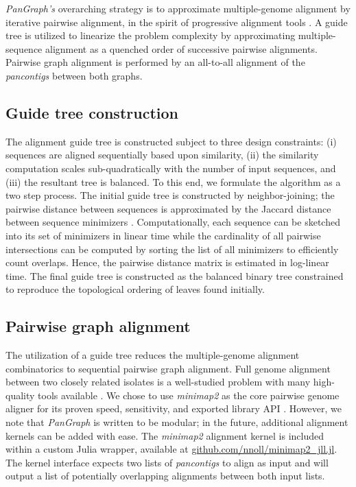\documentclass[aps,rmp,reprint,superscriptaddress,notitlepage,10pt]{revtex4-1}
\begin{document}
\emph{PanGraph's} overarching strategy is to approximate multiple-genome alignment by iterative pairwise alignment, in the spirit of progressive alignment tools \cite{darling2010progressivemauve,armstrong2020progressive}.
A guide tree is utilized to linearize the problem complexity by approximating multiple-sequence alignment as a quenched order of successive pairwise alignments.
Pairwise graph alignment is performed by an all-to-all alignment of the \emph{pancontigs} between both graphs.

\subsection{Guide tree construction}
The alignment guide tree is constructed subject to three design constraints: (i) sequences are aligned sequentially based upon similarity, (ii) the similarity computation scales sub-quadratically with the number of input sequences, and (iii) the resultant tree is balanced.
To this end, we formulate the algorithm as a two step process.
The initial guide tree is constructed by neighbor-joining; the pairwise distance between sequences is approximated by the Jaccard distance between sequence minimizers \cite{roberts2004reducing}.
Computationally, each sequence can be sketched into its set of minimizers in linear time while the cardinality of all pairwise intersections can be computed by sorting the list of all minimizers to efficiently count overlaps.
Hence, the pairwise distance matrix is estimated in log-linear time.
The final guide tree is constructed as the balanced binary tree constrained to reproduce the topological ordering of leaves found initially.

\subsection{Pairwise graph alignment}
The utilization of a guide tree reduces the multiple-genome alignment combinatorics to sequential pairwise graph alignment.
Full genome alignment between two closely related isolates is a well-studied problem with many high-quality tools available \cite{li2018minimap2,marccais2018mummer4}.
We chose to use \emph{minimap2} as the core pairwise genome aligner for its proven speed, sensitivity, and exported library API \cite{li2018minimap2}.
However, we note that \emph{PanGraph} is written to be modular; in the future, additional alignment kernels can be added with ease.
The \emph{minimap2} alignment kernel is included within a custom Julia wrapper, available at \url{github.com/nnoll/minimap2_jll.jl}.
The kernel interface expects two lists of \emph{pancontigs} to align as input and will output a list of potentially overlapping alignments between both input lists.
\end{document}
